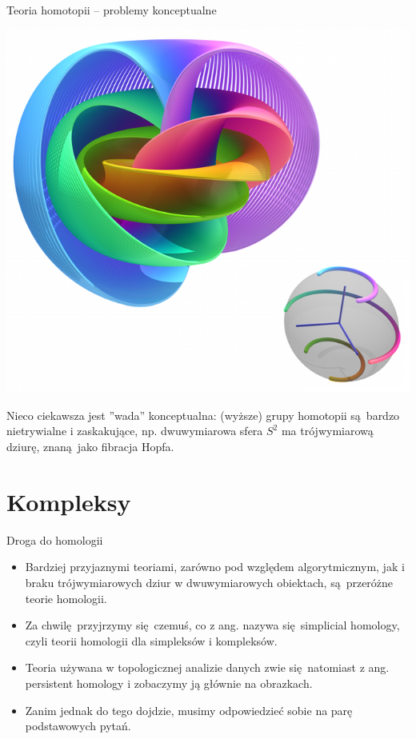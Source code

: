 \documentclass{beamer}
\begin{document}
\begin{frame}{Teoria homotopii -- problemy konceptualne}

\vspace{-0.3cm}
\begin{center}
\includegraphics[scale = 0.3]{FibracjaHopfa.png}
\end{center}
\vspace{-0.5cm}

Nieco ciekawsza jest ''wada'' konceptualna: (wyższe) grupy homotopii są bardzo nietrywialne i zaskakujące, np. dwuwymiarowa sfera $S^2$ ma trójwymiarową dziurę, znaną jako fibracja Hopfa.

\end{frame}

\section{Kompleksy}

\begin{frame}{Droga do homologii}
\begin{itemize}
	\item Bardziej przyjaznymi teoriami, zarówno pod względem algorytmicznym, jak i braku trójwymiarowych dziur w dwuwymiarowych obiektach, są przeróżne teorie homologii.
	\item Za chwilę przyjrzymy się czemuś, co z ang. nazywa się simplicial homology, czyli teorii homologii dla simpleksów i kompleksów.
	\item Teoria używana w topologicznej analizie danych zwie się natomiast z ang. persistent homology i zobaczymy ją głównie na obrazkach.
	\item Zanim jednak do tego dojdzie, musimy odpowiedzieć sobie na parę podstawowych pytań.
\end{itemize}
\end{frame}
\end{document}
